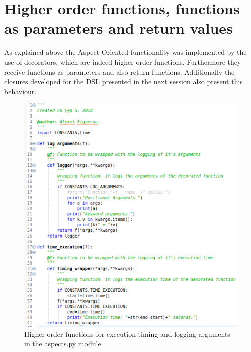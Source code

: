 \documentclass[margin,line,a4paper,authoryear,12pt]{report}
\begin{document}
\section{Higher order functions, functions as parameters and return values}
As explained above the Aspect Oriented functionality was implemented by the use of decorators, which
are indeed higher order functions. Furthermore they receive functions as parameters and also return
functions. Additionally the closures developed for the DSL presented in the  next session also present this behaviour.
\begin{figure}[h!]
    \centering
    \includegraphics[width=0.8\linewidth]{AOP_wrappers.png}
    \caption{ Higher order functions for execution timing and logging arguments in the aspects.py module}
    \label{fig:aspects}
\end{figure}
\end{document}
